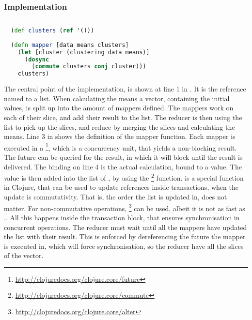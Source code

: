 





\subsubsection{Implementation}
\begin{lstlisting}[float,label=lst:stm_implementation,
  caption={\ac{STM} Implementation},
  language=clojure,  
  showspaces=false,
  showtabs=false,
  breaklines=true,
  showstringspaces=false,
  breakatwhitespace=true,
  commentstyle=\color{greencomments},
  keywordstyle=\color{bluekeywords},
  stringstyle=\color{redstrings}]  % Start your code-block
  
  (def clusters (ref '()))
    
  (defn mapper [data means clusters]
    (let [cluster (clustering data means)]
      (dosync
        (commute clusters conj cluster)))
    clusters)
\end{lstlisting}

The central point of the implementation, is shown at line 1 in . It is the reference named  to a list. When calculating the means a vector, containing the initial values, is split up into the amount of mappers defined. The mappers work on each of their slice, and add their result to the list. The reducer is then using the list to pick up the slices, and reduce by merging the slices and calculating the means. Line 3 in shows the definition of the mapper function. Each mapper is executed in a \footnote{\url{http://clojuredocs.org/clojure.core/future}}, which is a concurrency unit, that yields a non-blocking result. The future can be queried for the result, in which it will block until the result is delivered. The  binding on line 4 is the actual calculation, bound to a value. The  value is then added into the list of , by using the \footnote{\url{http://clojuredocs.org/clojure.core/commute}} function.  is a special function in Clojure, that can be used to update references inside transactions, when the update is commutativity. That is, the order the list is updated in, does not matter. For non-commutative operations, \footnote{\url{http://clojuredocs.org/clojure.core/alter}} can be used, albeit it is not as fast as .. All this happens inside the  transaction block, that ensures synchronisation in concurrent operations. The reducer must wait until all the mappers have updated the list with their result. This is enforced by dereferencing the future the mapper is executed in, which will force synchronisation, so the reducer have all the slices of the vector.

